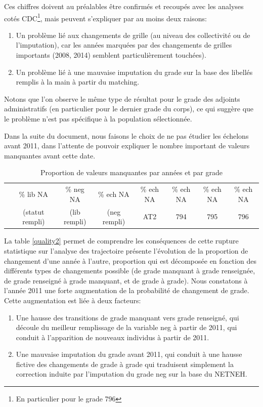 \documentclass[11pt,a4paper]{article}
\begin{document}
Ces chiffres doivent au préalables être confirmés et recoupés avec les analyses cotés CDC\footnote{En particulier pour le grade 796}, mais peuvent s'expliquer par au moins deux raisons: 
\begin{enumerate}
\item Un problème lié aux changements de grille (au niveau des collectivité ou de l'imputation), car les années marquées par des changements de grilles importants (2008, 2014) semblent particulièrement touchées). 
\item Un problème lié à une mauvaise imputation du grade sur la base des libellés remplis à la main à partir du matching. 
\end{enumerate}

Notons que l'on observe le même type de résultat pour le grade des adjoints administratifs (en particulier pour le dernier grade du corps), ce qui suggère que le problème n'est pas spécifique à la population sélectionnée.

Dans la suite du document, nous faisons le choix de ne pas étudier les échelons avant 2011, dans l'attente de pouvoir expliquer le nombre important de valeurs manquantes avant cette date. 



\begin{table}[h!]
\centering
\caption{Proportion de valeurs manquantes par années et par grade} 
\label{quality1}
\begin{tabular}{lccccccc}
\toprule
 & \%  lib NA & \% neg NA  & \% ech NA & \% ech NA   & \% ech NA   & \% ech NA  & \% ech NA  \\ 
&(statut rempli) & (lib rempli) & (neg rempli) & AT2 & 794 & 795 & 796 \\
\midrule 
 
\bottomrule
\end{tabular}
\end{table}


La table \ref{quality2} permet de comprendre les conséquences de cette rupture statistique sur l'analyse des trajectoire présente l'évolution de la proportion de changement d'une année à l'autre, proportion qui est décomposée en fonction des différents types de changements possible (de grade manquant à grade renseignée, de grade renseigné à grade manquant, et de grade à grade). 
Nous constatons à l'année 2011 une forte augmentation de la probabilité de changement de grade. Cette augmentation est liée à deux facteurs: 
\begin{enumerate}
\item Une hausse des transitions de grade manquant vers grade renseigné, qui découle du meilleur remplissage de la variable neg à partir de 2011, qui conduit à l'apparition de nouveaux individus à partir de 2011.  
\item Une mauvaise imputation du grade avant 2011, qui conduit à une hausse fictive des changements de grade à grade qui traduisent simplement la correction induite par l'imputation du grade neg sur la base du NETNEH. 
\end{enumerate}
 
\end{document}

